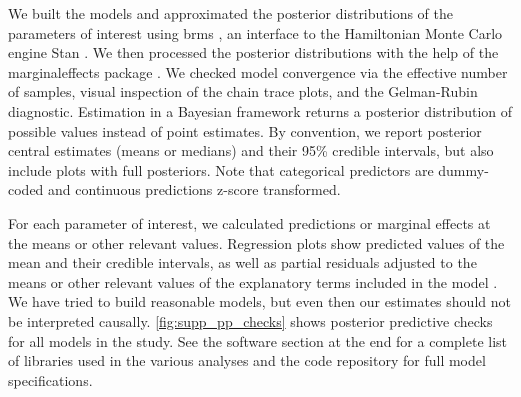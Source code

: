 \documentclass[9pt, onecolumn, twoside, lineno]{gsajnl}
\begin{document}
We built the models and approximated the posterior distributions of the parameters of interest using brms \autocite{brms2017}, an interface to the Hamiltonian Monte Carlo engine Stan \autocite{stan2023}. We then processed the posterior distributions with the help of the marginaleffects package \autocite{marginaleffects}. We checked model convergence via the effective number of samples, visual inspection of the chain trace plots, and the Gelman-Rubin diagnostic. Estimation in a Bayesian framework returns a posterior distribution of possible values instead of point estimates. By convention, we report posterior central estimates (means or medians) and their 95\% credible intervals, but also include plots with full posteriors. Note that categorical predictors are dummy-coded and continuous predictions z-score transformed.

For each parameter of interest, we calculated predictions or marginal effects at the means or other relevant values.  Regression plots show predicted values of the mean and their credible intervals, as well as partial residuals adjusted to the means or other relevant values of the explanatory terms included in the model \autocite{fox2018, larsen1972}. We have tried to build reasonable models, but even then our estimates should not be interpreted causally. \autoref{fig:supp_pp_checks} shows posterior predictive checks for all models in the study. See the software section at the end for a complete list of libraries used in the various analyses and the code repository for full model specifications.
\end{document}
